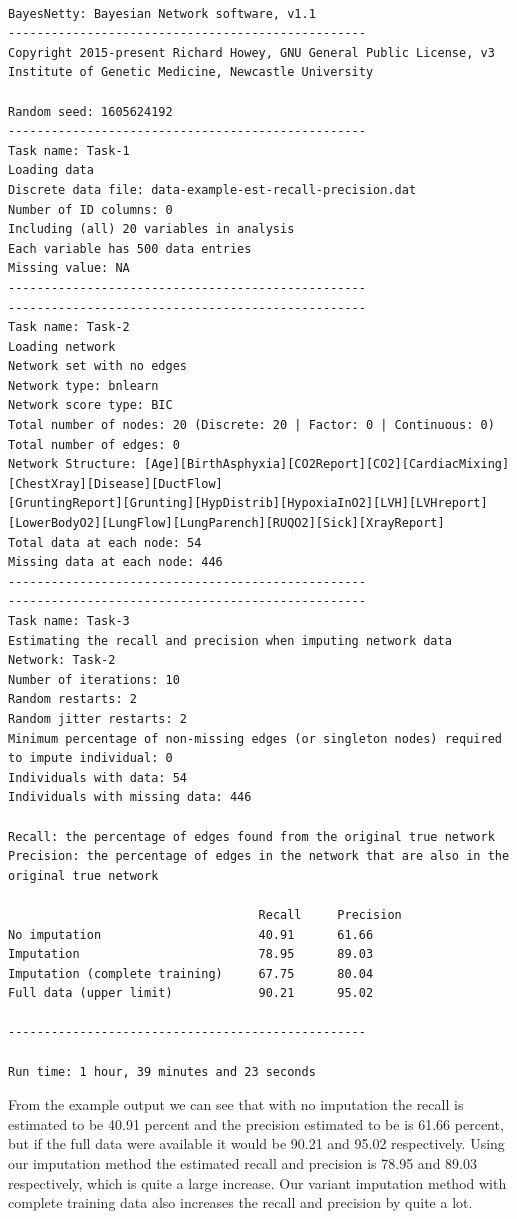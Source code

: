 \documentclass[a4paper,12pt]{article}
\begin{document}
\vspace{0.35cm} \begin{lstlisting}

BayesNetty: Bayesian Network software, v1.1
--------------------------------------------------
Copyright 2015-present Richard Howey, GNU General Public License, v3
Institute of Genetic Medicine, Newcastle University

Random seed: 1605624192
--------------------------------------------------
Task name: Task-1
Loading data
Discrete data file: data-example-est-recall-precision.dat
Number of ID columns: 0
Including (all) 20 variables in analysis
Each variable has 500 data entries
Missing value: NA
--------------------------------------------------
--------------------------------------------------
Task name: Task-2
Loading network
Network set with no edges
Network type: bnlearn
Network score type: BIC
Total number of nodes: 20 (Discrete: 20 | Factor: 0 | Continuous: 0)
Total number of edges: 0
Network Structure: [Age][BirthAsphyxia][CO2Report][CO2][CardiacMixing][ChestXray][Disease][DuctFlow]
[GruntingReport][Grunting][HypDistrib][HypoxiaInO2][LVH][LVHreport][LowerBodyO2][LungFlow][LungParench][RUQO2][Sick][XrayReport]
Total data at each node: 54
Missing data at each node: 446
--------------------------------------------------
--------------------------------------------------
Task name: Task-3
Estimating the recall and precision when imputing network data
Network: Task-2
Number of iterations: 10
Random restarts: 2
Random jitter restarts: 2
Minimum percentage of non-missing edges (or singleton nodes) required to impute individual: 0
Individuals with data: 54
Individuals with missing data: 446

Recall: the percentage of edges found from the original true network
Precision: the percentage of edges in the network that are also in the original true network

                                   Recall     Precision
No imputation                      40.91      61.66
Imputation                         78.95      89.03
Imputation (complete training)     67.75      80.04
Full data (upper limit)            90.21      95.02

--------------------------------------------------

Run time: 1 hour, 39 minutes and 23 seconds

\end{lstlisting} \vspace{0.35cm}
From the example output we can see that with no imputation the recall is estimated to be 40.91 percent and the precision estimated to be is 61.66 percent, but if the full data were available it would be 90.21 and 95.02 respectively. Using our imputation method the estimated recall and precision is 78.95 and 89.03 respectively, which is quite a large increase. Our variant imputation method with complete training data also increases the recall and precision by quite a lot. 
\end{document}
